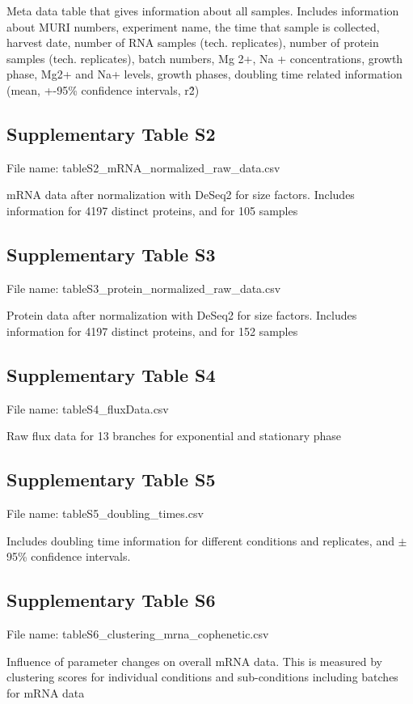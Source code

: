 \documentclass[a4paper]{article}
\begin{document}
Meta data table that gives information about all samples. Includes information about MURI numbers, experiment name, the time that sample is collected, harvest date, number of RNA samples (tech. replicates), number of protein samples (tech. replicates), batch numbers, Mg 2+, Na + concentrations, growth phase, Mg2+ and Na+ levels, growth phases, doubling time related information (mean, +-95\% confidence intervals, r\^2)

\subsection*{Supplementary Table S2}
File name: tableS2\_mRNA\_normalized\_raw\_data.csv

mRNA data after normalization with DeSeq2 for size factors. Includes information for 4197 distinct proteins, and for 105 samples

\subsection*{Supplementary Table S3}
File name: tableS3\_protein\_normalized\_raw\_data.csv

Protein data after normalization with DeSeq2 for size factors. Includes information for 4197 distinct proteins, and for 152 samples

\subsection*{Supplementary Table S4}
File name: tableS4\_fluxData.csv

Raw flux data for 13 branches for exponential and stationary phase

\subsection*{Supplementary Table S5}
File name: tableS5\_doubling\_times.csv

Includes doubling time information for different conditions and replicates,  and $\pm$95\% confidence intervals.

\subsection*{Supplementary Table S6}
File name: tableS6\_clustering\_mrna\_cophenetic.csv

Influence of parameter changes on overall mRNA data. This is measured by clustering scores for individual conditions and sub-conditions including batches for mRNA data
\end{document}
